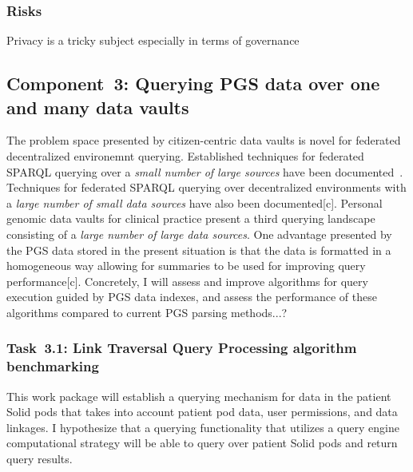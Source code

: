 \documentclass[a4paper,11pt]{article}
\begin{document}
\begin{refsection}


\subsubsection{Risks}
Privacy is a tricky subject especially in terms of governance

\newcommand\WPc{Querying PGS data over one and many data vaults}
\subsection{Component~3: \WPc}

The problem space presented by citizen-centric data vaults is novel for federated decentralized environemnt querying. 
Established techniques for federated SPARQL querying over a \emph{small number of large sources} have been documented~\cite{hibiscus, tpf, sparql_adaptive_anapsid}.
Techniques for federated SPARQL querying over decentralized environments with a \emph{large number of small data sources} have also been documented[c].
Personal genomic data vaults for clinical practice present a third querying landscape consisting of a \emph{large number of large data sources}.
One advantage presented by the PGS data stored in the present situation is that the data is formatted in a homogeneous way allowing for summaries to be used for improving query performance[c].
Concretely, I will assess and improve algorithms for query execution guided by PGS data indexes,
and assess the performance of these algorithms compared to current PGS parsing methods...?

\newcommand\WPca{Link Traversal Query Processing algorithm benchmarking}
\subsubsection{Task~3.1: \WPca}

This work package will establish a querying mechanism for data in the patient Solid pods that takes into account patient pod data, user permissions, and data linkages. 
I hypothesize that a querying functionality that utilizes a query engine computational strategy will be able to query over patient Solid pods and return query results.


\end{refsection}
\end{document}
